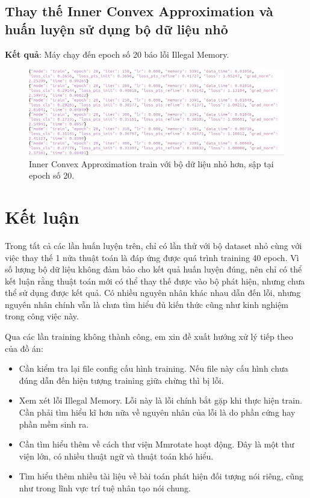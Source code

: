 \documentclass[12pt,a4paper,openany,oneside]{report}
\begin{document}
\section{Thay thế Inner Convex Approximation và huấn luyện sử dụng bộ dữ liệu nhỏ}

\textbf{Kết quả}: Máy chạy đến epoch số 20 báo lỗi Illegal Memory.

\begin{figure}[ht!]
	\begin{center}
		\includegraphics[width=450px]{./inner_smalldata_epoch20.JPG}
		\caption{Inner Convex Approximation train với bộ dữ liệu nhỏ hơn, sập tại epoch số 20.}
		\label{inner_smalldata_epoch20}
	\end{center}
\end{figure} 

\chapter*{{Kết luận}}

Trong tất cả các lần huấn luyện trên, chỉ có lần thử với bộ dataset nhỏ cùng với việc thay thế 1 nửa thuật toán là đáp ứng được quá trình training 40 epoch. Vì số lượng bộ dữ liệu không đảm bảo cho kết quả huấn luyện đúng, nên chỉ có thể kết luận rằng thuật toán mới có thể thay thế được vào bộ phát hiện, nhưng chưa thể sử dụng được kết quả. Có nhiều nguyên nhân khác nhau dẫn đến lỗi, nhưng nguyên nhân chính vẫn là chưa tìm hiểu đủ kiến thức cũng như kinh nghiệm trong công việc này.

Qua các lần training không thành công, em xin đề xuất hướng xử lý tiếp theo của đồ án:
\begin{itemize}
	\item Cần kiểm tra lại file config cấu hình training. Nếu file này cấu hình chưa đúng dẫn đến hiện tượng training giữa chừng thì bị lỗi.
	\item Xem xét lỗi Illegal Memory. Lỗi này là lỗi chính bắt gặp khi thực hiện train. Cần phải tìm hiểu kĩ hơn nữa về nguyên nhân của lỗi là do phần cứng hay phần mềm sinh ra.
	\item Cần tìm hiểu thêm về cách thư viện Mmrotate hoạt động. Đây là một thư viện lớn, có nhiều thuật ngữ và thuật toán khó hiểu. 
	\item Tìm hiểu thêm nhiều tài liệu về bài toán phát hiện đối tượng nói riêng, cũng như trong lĩnh vực trí tuệ nhân tạo nói chung.
\end{itemize}
\end{document}

